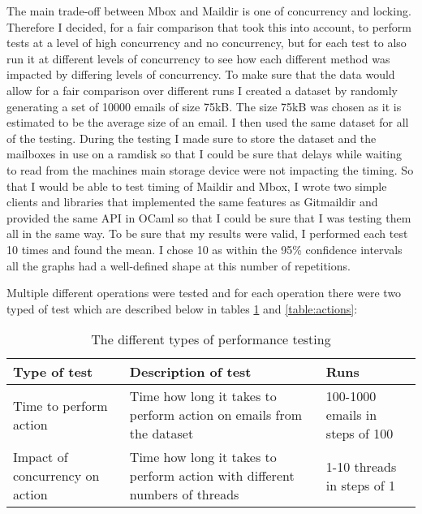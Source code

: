 The main trade-off between Mbox and Maildir is one of concurrency and locking. Therefore I decided, for a fair comparison that took this into account, to perform tests at a level of high concurrency and no concurrency, but for each test to also run it at different levels of concurrency to see how each different method was impacted by differing levels of concurrency. To make sure that the data would allow for a fair comparison over different runs I created a dataset by randomly generating a set of 10000 emails of size 75kB. The size 75kB was chosen as it is estimated to be the average size of an email\cite{email_size}. I then used the same dataset for all of the testing. During the testing I made sure to store the dataset and the mailboxes in use on a ramdisk so that I could be sure that delays while waiting to read from the machines main storage device were not impacting the timing. So that I would be able to test timing of Maildir and Mbox, I wrote two simple clients and libraries that implemented the same features as Gitmaildir and provided the same API in OCaml so that I could be sure that I was testing them all in the same way. To be sure that my results were valid, I performed each test 10 times and found the mean. I chose 10 as within the 95\% confidence intervals all the graphs had a well-defined shape at this number of repetitions.

Multiple different operations were tested and for each operation there were two typed of test which are described below in tables \ref{table:tests} and \ref{table:actions}:

\begin{table}[h]
\footnotesize
\centering
\begin{tabular}{p{3.5cm} p{7.5cm} p{3cm}}
  \toprule
  Type of test & Description of test & Runs \\
  \midrule
  Time to perform action & Time how long it takes to perform action on emails from the dataset & 100-1000 emails in steps of 100 \\
  Impact of concurrency on action & Time how long it takes to perform action with different numbers of threads & 1-10 threads in steps of 1 \\
  \bottomrule
\end{tabular}
\caption{The different types of performance testing}
\label{table:tests}
\end{table}

